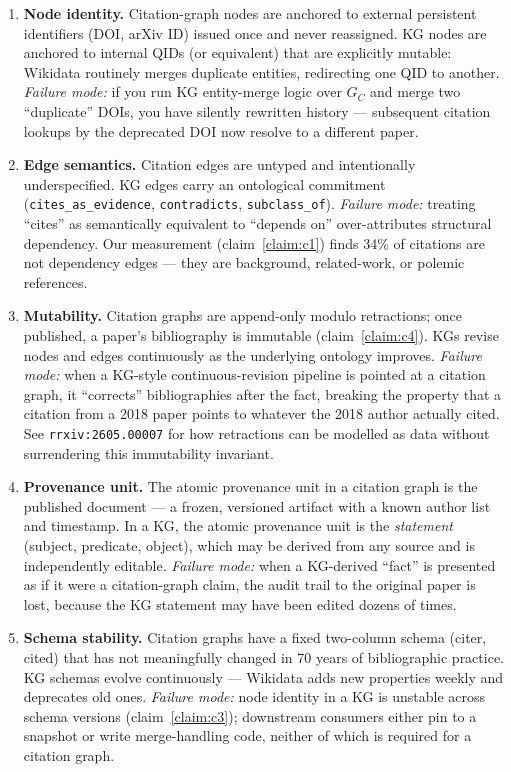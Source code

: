 \documentclass{rrxiv}
\begin{document}
\begin{enumerate}[leftmargin=*]
\item \textbf{Node identity.} Citation-graph nodes are anchored to external persistent identifiers (DOI, arXiv ID) issued once and never reassigned. KG nodes are anchored to internal QIDs (or equivalent) that are explicitly mutable: Wikidata routinely merges duplicate entities, redirecting one QID to another. \emph{Failure mode:} if you run KG entity-merge logic over $G_C$ and merge two ``duplicate'' DOIs, you have silently rewritten history --- subsequent citation lookups by the deprecated DOI now resolve to a different paper.

\item \textbf{Edge semantics.} Citation edges are untyped and intentionally underspecified. KG edges carry an ontological commitment (\texttt{cites\_as\_evidence}, \texttt{contradicts}, \texttt{subclass\_of}). \emph{Failure mode:} treating ``cites'' as semantically equivalent to ``depends on'' over-attributes structural dependency. Our measurement (claim~\ref{claim:c1}) finds 34\% of citations are not dependency edges --- they are background, related-work, or polemic references.

\item \textbf{Mutability.} Citation graphs are append-only modulo retractions; once published, a paper's bibliography is immutable (claim~\ref{claim:c4}). KGs revise nodes and edges continuously as the underlying ontology improves. \emph{Failure mode:} when a KG-style continuous-revision pipeline is pointed at a citation graph, it ``corrects'' bibliographies after the fact, breaking the property that a citation from a 2018 paper points to whatever the 2018 author actually cited. See \texttt{rrxiv:2605.00007} for how retractions can be modelled as data without surrendering this immutability invariant.

\item \textbf{Provenance unit.} The atomic provenance unit in a citation graph is the published document --- a frozen, versioned artifact with a known author list and timestamp. In a KG, the atomic provenance unit is the \emph{statement} (subject, predicate, object), which may be derived from any source and is independently editable. \emph{Failure mode:} when a KG-derived ``fact'' is presented as if it were a citation-graph claim, the audit trail to the original paper is lost, because the KG statement may have been edited dozens of times.

\item \textbf{Schema stability.} Citation graphs have a fixed two-column schema (citer, cited) that has not meaningfully changed in 70 years of bibliographic practice. KG schemas evolve continuously --- Wikidata adds new properties weekly and deprecates old ones. \emph{Failure mode:} node identity in a KG is unstable across schema versions (claim~\ref{claim:c3}); downstream consumers either pin to a snapshot or write merge-handling code, neither of which is required for a citation graph.


\end{enumerate}
\end{document}
